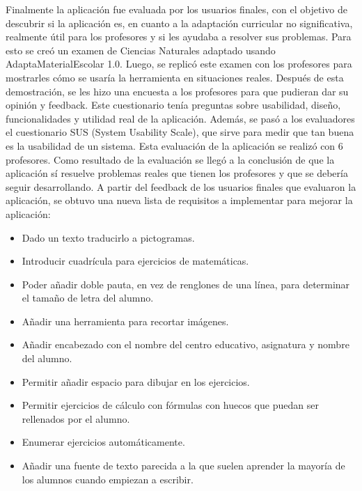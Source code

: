 Finalmente la aplicación fue evaluada por los usuarios finales, con el objetivo de descubrir si la aplicación es, en cuanto a la adaptación curricular no significativa, realmente útil para los profesores y si les ayudaba a resolver sus problemas. Para esto se creó un examen de Ciencias Naturales adaptado usando AdaptaMaterialEscolar 1.0. Luego, se replicó este examen con los profesores para mostrarles cómo se usaría la herramienta en situaciones reales. Después de esta demostración, se les hizo una encuesta a los profesores para que pudieran dar su opinión y feedback. Este cuestionario tenía preguntas sobre usabilidad, diseño, funcionalidades y utilidad real de la aplicación. Además, se pasó a los evaluadores el cuestionario SUS (System Usability Scale), que sirve para medir que tan buena es la usabilidad de un sistema. Esta evaluación de la aplicación se realizó con 6 profesores. Como resultado de la evaluación se llegó a la conclusión de que la aplicación sí resuelve problemas reales que tienen los profesores y que se debería seguir desarrollando. A partir del feedback de los usuarios finales que evaluaron la aplicación, se obtuvo una nueva lista de requisitos a implementar para mejorar la aplicación:

\begin{itemize}
    \item Dado un texto traducirlo a pictogramas.
    \item Introducir cuadrícula para ejercicios de matemáticas.
    \item Poder añadir doble pauta, en vez de renglones de una línea, para determinar el tamaño de letra del alumno.
    \item Añadir una herramienta para recortar imágenes.
    \item Añadir encabezado con el nombre del centro educativo, asignatura y nombre del alumno.
    \item Permitir añadir espacio para dibujar en los ejercicios.
    \item Permitir ejercicios de cálculo con fórmulas con huecos que puedan ser rellenados por el alumno.
    \item Enumerar ejercicios automáticamente.
    \item Añadir una fuente de texto parecida a la que suelen aprender la mayoría de los alumnos cuando empiezan a escribir.
\end{itemize}

